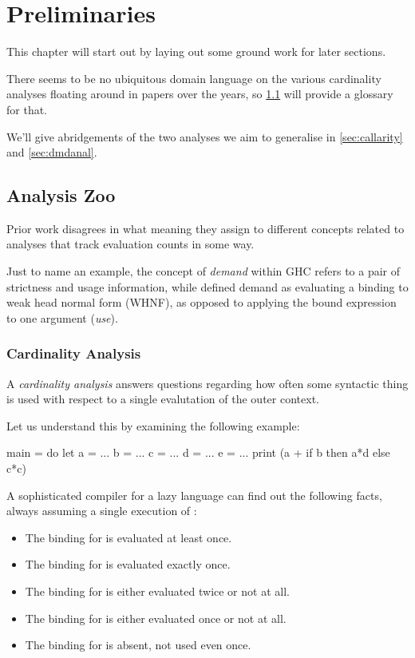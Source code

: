 \chapter{Preliminaries}\label{sec:prel}

This chapter will start out by laying out some ground work for later sections.

There seems to be no ubiquitous domain language on the various cardinality analyses floating around in papers over the years, so \cref{sec:zoo} will provide a glossary for that.

We'll give abridgements of the two analyses we aim to generalise in \cref{sec:callarity} and \cref{sec:dmdanal}.

\section{Analysis Zoo}\label{sec:zoo}

Prior work disagrees in what meaning they assign to different concepts related to analyses that track evaluation counts in some way.

Just to name an example, the concept of \emph{demand} within GHC refers to a pair of strictness and usage information, while \textcite[appendix~C.2]{warnsbrough} defined demand as evaluating a binding to weak head normal form (WHNF), as opposed to applying the bound expression to one argument (\emph{use}).

\subsection{Cardinality Analysis}\label{sec:card}

A \emph{cardinality analysis} answers questions regarding how often some syntactic thing is used with respect to a single evalutation of the outer context.

Let us understand this by examining the following example:

\begin{haskellcode}
  main = do
    let a = ...
        b = ...
        c = ...
        d = ...
        e = ...
    print (a + if b then a*d else c*c)
\end{haskellcode}

A sophisticated compiler for a lazy language can find out the following facts, always assuming a single execution of :
\begin{itemize}
  \item The binding for  is evaluated at least once.
  \item The binding for  is evaluated exactly once.
  \item The binding for  is either evaluated twice or not at all.
  \item The binding for  is either evaluated once or not at all.
  \item The binding for  is absent, \eg not used even once.
\end{itemize}

